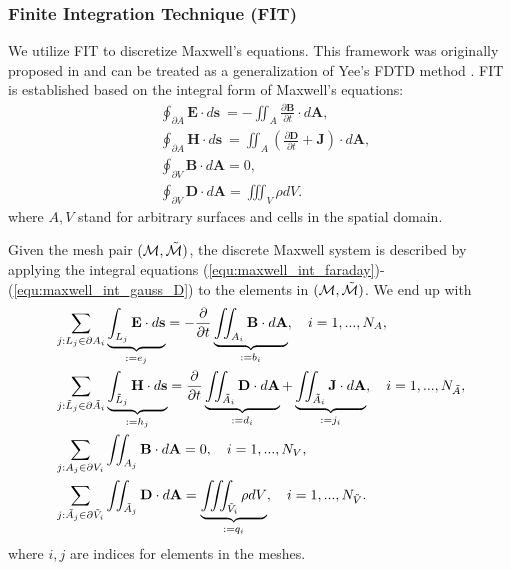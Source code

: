 \documentclass{article}
\begin{document}
\subsubsection{Finite Integration Technique (FIT)}
We utilize FIT to discretize Maxwell's equations. This framework was originally proposed in \cite{weiland_1977} and can be treated as a generalization of Yee's FDTD method \cite{yee_1966}. FIT is established based on the integral form of Maxwell's equations:
\begin{subequations}
\begin{align}
    &\oint_{\partial A} \mathbf{E} \cdot d\mathbf{s} \ = - \iint_A \frac{\partial \mathbf{B}}{\partial t} \cdot d\mathbf{A}, \label{equ:maxwell_int_faraday}\\
    &\oint_{\partial A} \mathbf{H} \cdot d\mathbf{s} \ = \iint_A \left(\frac{\partial \mathbf{D}}{\partial t} + \mathbf{J}\right) \cdot d\mathbf{A}, \label{equ:maxwell_int_ampere}\\
    &\oint_{\partial V} \mathbf{B} \cdot d\mathbf{A} = 0, \label{equ:maxwell_int_gauss_B}\\
    &\oint_{\partial V} \mathbf{D} \cdot d\mathbf{A} = \iiint_V \rho dV. \label{equ:maxwell_int_gauss_D}
\end{align}
\end{subequations}
where $A, V$ stand for arbitrary surfaces and cells in the spatial domain. 

Given the mesh pair $(\mathcal{M}, \Tilde{\mathcal{M}})$, the discrete Maxwell system is described by applying the integral equations (\ref{equ:maxwell_int_faraday})-(\ref{equ:maxwell_int_gauss_D}) to the elements in $(\mathcal{M}, \Tilde{\mathcal{M}})$. We end up with
\begin{subequations}
\begin{align}
    &\sum_{j:L_j\in\partial A_i} \underbrace{\int_{L_j} \mathbf{E} \cdot d\mathbf{s}}_{:= e_j} = - \frac{\partial}{\partial t} \underbrace{\iint_{A_i} \mathbf{B} \cdot d\mathbf{A}}_{:= b_i},\ \ \ i = 1,...,N_A, \label{equ:maxwell_grid_faraday} \\
    &\sum_{j:\Tilde{L}_j\in\partial \Tilde{A}_i} \underbrace{\int_{\Tilde{L}_j} \mathbf{H} \cdot d\mathbf{s}}_{:= h_j} = \frac{\partial}{\partial t} \underbrace{\iint_{\Tilde{A}_i} \mathbf{D} \cdot d\mathbf{A}}_{:= d_i} + \underbrace{\iint_{\Tilde{A}_i} \mathbf{J} \cdot d\mathbf{A}}_{:= j_i}, \ \ \ i = 1,...,N_{\Tilde{A}}, \label{equ:maxwell_grid_ampere}\\
    &\sum_{j:A_j\in \partial V_i} \iint_{A_j} \mathbf{B} \cdot d\mathbf{A} = 0,\ \ \ i = 1,..., N_V,\label{equ:maxwell_grid_gauss_B}\\
    &\sum_{j:\Tilde{A}_j \in \partial\Tilde{V}_i}\iint_{\Tilde{A}_j} \mathbf{D} \cdot d\mathbf{A} = \underbrace{\iiint_{\Tilde{V}_i} \rho dV}_{:= q_i},\ \ \ i = 1,...,N_{\Tilde{V}}. \label{equ:maxwell_grid_gauss_D}
\end{align}
\end{subequations}
where $i, j$ are indices for elements in the meshes.
\end{document}
